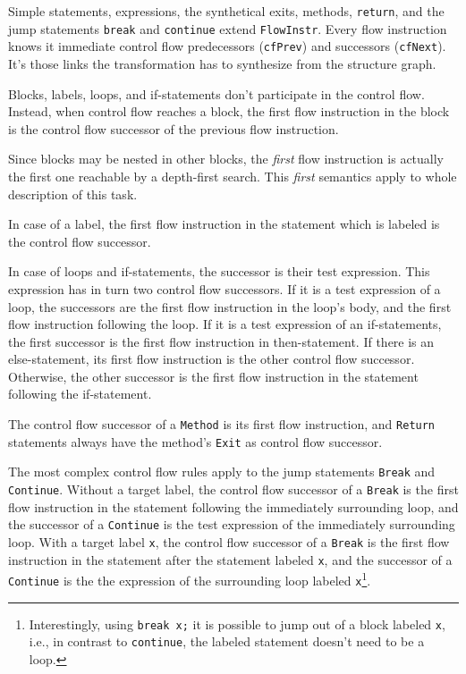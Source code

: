 \documentclass[10pt]{article}
\begin{document}
Simple statements, expressions, the synthetical exits, methods, \verb|return|,
and the jump statements \verb|break| and \verb|continue| extend
\verb|FlowInstr|.  Every flow instruction knows it immediate control flow
predecessors (\verb|cfPrev|) and successors (\verb|cfNext|).  It's those links
the transformation has to synthesize from the structure graph.

Blocks, labels, loops, and if-statements don't participate in the control flow.
Instead, when control flow reaches a block, the first flow instruction in the
block is the control flow successor of the previous flow instruction.

Since blocks may be nested in other blocks, the \emph{first} flow instruction
is actually the first one reachable by a depth-first search.  This \emph{first}
semantics apply to whole description of this task.

In case of a label, the first flow instruction in the statement which is
labeled is the control flow successor.

In case of loops and if-statements, the successor is their test expression.
This expression has in turn two control flow successors.  If it is a test
expression of a loop, the successors are the first flow instruction in the
loop's body, and the first flow instruction following the loop.  If it is a
test expression of an if-statements, the first successor is the first flow
instruction in then-statement.  If there is an else-statement, its first flow
instruction is the other control flow successor.  Otherwise, the other
successor is the first flow instruction in the statement following the
if-statement.

The control flow successor of a \verb|Method| is its first flow instruction,
and \verb|Return| statements always have the method's \verb|Exit| as control
flow successor.

The most complex control flow rules apply to the jump statements \verb|Break|
and \verb|Continue|.  Without a target label, the control flow successor of a
\verb|Break| is the first flow instruction in the statement following the
immediately surrounding loop, and the successor of a \verb|Continue| is the
test expression of the immediately surrounding loop.  With a target label
\verb|x|, the control flow successor of a \verb|Break| is the first flow
instruction in the statement after the statement labeled \verb|x|, and the
successor of a \verb|Continue| is the the expression of the surrounding loop
labeled \verb|x|\footnote{Interestingly, using \texttt{break x;} it is possible
  to jump out of a block labeled \texttt{x}, i.e., in contrast to
  \texttt{continue}, the labeled statement doesn't need to be a loop.}.
\end{document}
